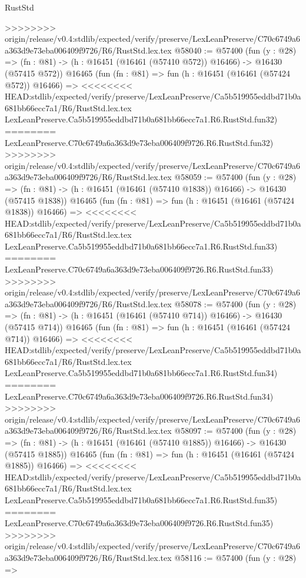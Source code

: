 \begin{lexlean}{RustStd}
\begin{coremodule}
{\begin{coremodule}
{{{{{{{{{{{{{{{{{{{{{{{{{{{{{{{{{{{{{{{{{{{{{{{{{{{{{{{>>>>>>>> origin/release/v0.4:stdlib/expected/verify/preserve/LexLeanPreserve/C70c6749a6a363d9e73eba006409f9726/R6/RustStd.lex.tex
@58040 := @57400
    (fun (y : @28) =>
    (fn : @81) -> (h : @16451 (@16461 (@57410 @572)) @16466) -> @16430 (@57415 @572))
    @16465
    (fun (fn : @81) =>
    fun (h : @16451 (@16461 (@57424 @572)) @16466) =>
<<<<<<<< HEAD:stdlib/expected/verify/preserve/LexLeanPreserve/Ca5b519955eddbd71b0a681bb66ecc7a1/R6/RustStd.lex.tex
    LexLeanPreserve.Ca5b519955eddbd71b0a681bb66ecc7a1.R6.RustStd.fun32)
========
    LexLeanPreserve.C70c6749a6a363d9e73eba006409f9726.R6.RustStd.fun32)
>>>>>>>> origin/release/v0.4:stdlib/expected/verify/preserve/LexLeanPreserve/C70c6749a6a363d9e73eba006409f9726/R6/RustStd.lex.tex
@58059 := @57400
    (fun (y : @28) =>
    (fn : @81) -> (h : @16451 (@16461 (@57410 @1838)) @16466) -> @16430 (@57415 @1838))
    @16465
    (fun (fn : @81) =>
    fun (h : @16451 (@16461 (@57424 @1838)) @16466) =>
<<<<<<<< HEAD:stdlib/expected/verify/preserve/LexLeanPreserve/Ca5b519955eddbd71b0a681bb66ecc7a1/R6/RustStd.lex.tex
    LexLeanPreserve.Ca5b519955eddbd71b0a681bb66ecc7a1.R6.RustStd.fun33)
========
    LexLeanPreserve.C70c6749a6a363d9e73eba006409f9726.R6.RustStd.fun33)
>>>>>>>> origin/release/v0.4:stdlib/expected/verify/preserve/LexLeanPreserve/C70c6749a6a363d9e73eba006409f9726/R6/RustStd.lex.tex
@58078 := @57400
    (fun (y : @28) =>
    (fn : @81) -> (h : @16451 (@16461 (@57410 @714)) @16466) -> @16430 (@57415 @714))
    @16465
    (fun (fn : @81) =>
    fun (h : @16451 (@16461 (@57424 @714)) @16466) =>
<<<<<<<< HEAD:stdlib/expected/verify/preserve/LexLeanPreserve/Ca5b519955eddbd71b0a681bb66ecc7a1/R6/RustStd.lex.tex
    LexLeanPreserve.Ca5b519955eddbd71b0a681bb66ecc7a1.R6.RustStd.fun34)
========
    LexLeanPreserve.C70c6749a6a363d9e73eba006409f9726.R6.RustStd.fun34)
>>>>>>>> origin/release/v0.4:stdlib/expected/verify/preserve/LexLeanPreserve/C70c6749a6a363d9e73eba006409f9726/R6/RustStd.lex.tex
@58097 := @57400
    (fun (y : @28) =>
    (fn : @81) -> (h : @16451 (@16461 (@57410 @1885)) @16466) -> @16430 (@57415 @1885))
    @16465
    (fun (fn : @81) =>
    fun (h : @16451 (@16461 (@57424 @1885)) @16466) =>
<<<<<<<< HEAD:stdlib/expected/verify/preserve/LexLeanPreserve/Ca5b519955eddbd71b0a681bb66ecc7a1/R6/RustStd.lex.tex
    LexLeanPreserve.Ca5b519955eddbd71b0a681bb66ecc7a1.R6.RustStd.fun35)
========
    LexLeanPreserve.C70c6749a6a363d9e73eba006409f9726.R6.RustStd.fun35)
>>>>>>>> origin/release/v0.4:stdlib/expected/verify/preserve/LexLeanPreserve/C70c6749a6a363d9e73eba006409f9726/R6/RustStd.lex.tex
@58116 := @57400
    (fun (y : @28) =>
}}}}}}}}}}}}}}}}}}}}}}}}}}}}}}}}}}}}}}}}}}}}}}}}}}}}}}}
\end{coremodule}}
\end{coremodule}
\end{lexlean}
